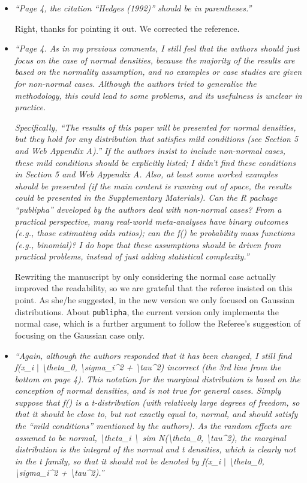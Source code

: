 \documentclass[11pt]{article}
\begin{document}
\begin{itemize}
\item \emph{``Page 4, the citation “Hedges (1992)” should be in parentheses.''}

Right, thanks for pointing it out. We corrected the reference.\\

\item \emph{``Page 4. As in my previous comments, I still feel that the authors should just focus on the case of normal densities, because the majority of the results are based on the normality assumption, and no examples or case studies are given for non-normal cases. Although the authors tried to generalize the methodology, this could lead to some problems, and its usefulness is unclear in practice.}

\emph{Specifically, ``The results of this paper will be presented for normal densities, but they hold for any distribution that satisfies mild conditions (see Section 5 and Web Appendix A).'' If the authors insist to include non-normal cases, these mild conditions should be explicitly listed; I didn't find these conditions in Section 5 and Web Appendix A. Also, at least some worked examples should be presented (if the main content is running out of space, the results could be presented in the Supplementary Materials). Can the R package ``publipha'' developed by the authors deal with non-normal cases? From a practical perspective, many real-world meta-analyses have binary outcomes (e.g., those estimating odds ratios); can the f() be probability mass functions (e.g., binomial)? I do hope that these assumptions should be driven from practical problems, instead of just adding statistical complexity.''}

Rewriting the manuscript by only considering the normal case actually improved the readability, so we are grateful that the referee insisted on this point. As she/he suggested, in the new version we only focused on Gaussian distributions. About \texttt{publipha}, the current version only implements the normal case, which is a further argument to follow the Referee's suggestion of focusing on the Gaussian case only.\\

\item \emph{``Again, although the authors responded that it has been changed, I still find f(x\_i $\mid$ \textbackslash theta\_0, \textbackslash sigma\_i\^{}2 + \textbackslash tau\^{}2) incorrect (the 3rd line from the bottom on page 4). This notation for the marginal distribution is based on the conception of normal densities, and is not true for general cases. Simply suppose that f() is a t-distribution (with relatively large degrees of freedom, so that it should be close to, but not exactly equal to, normal, and should satisfy the “mild conditions” mentioned by the authors). As the random effects are assumed to be normal, \textbackslash theta\_i \textbackslash\ sim N(\textbackslash theta\_0, \textbackslash tau\^{}2), the marginal distribution is the integral of the normal and t densities, which is clearly not in the t family, so that it should not be denoted by f(x\_i $\mid$ \textbackslash theta\_0, \textbackslash sigma\_i\^{}2 + \textbackslash tau\^{}2).''}


\end{itemize}
\end{document}
